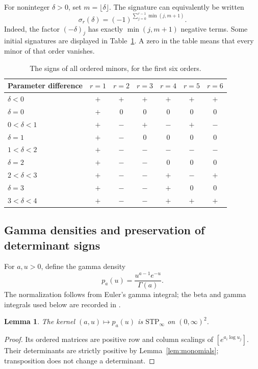 \documentclass[11pt,a4paper]{article}
\newtheorem{lemma}[theorem]{Lemma}
\theoremstyle{definition}
\theoremstyle{remark}
\newcommand{\STP}{\mathrm{STP}}
\begin{document}
For noninteger \(\delta>0\), set \(m=\lfloor\delta\rfloor\). The signature
can equivalently be written
\begin{equation}\label{eq:floor-sign}
 \sigma_r(\delta)=
 (-1)^{\sum_{j=0}^{r-1}\min(j,m+1)}.
\end{equation}
Indeed, the factor \((-\delta)_j\) has exactly
\(\min(j,m+1)\) negative terms. Some initial signatures are displayed in
Table~\ref{tab:signs}. A zero in the table means that every minor of that
order vanishes.

\begin{table}[htbp]
\centering
\caption{The signs of all ordered minors, for the first six orders.}
\label{tab:signs}
\begin{tabular}{lcccccc}
\toprule
Parameter difference & \(r=1\)&\(r=2\)&\(r=3\)&\(r=4\)&\(r=5\)&\(r=6\)\\
\midrule
\(\delta<0\)   & \(+\)&\(+\)&\(+\)&\(+\)&\(+\)&\(+\)\\
\(\delta=0\)   & \(+\)&\(0\)&\(0\)&\(0\)&\(0\)&\(0\)\\
\(0<\delta<1\) & \(+\)&\(-\)&\(+\)&\(-\)&\(+\)&\(-\)\\
\(\delta=1\)   & \(+\)&\(-\)&\(0\)&\(0\)&\(0\)&\(0\)\\
\(1<\delta<2\) & \(+\)&\(-\)&\(-\)&\(-\)&\(-\)&\(-\)\\
\(\delta=2\)   & \(+\)&\(-\)&\(-\)&\(0\)&\(0\)&\(0\)\\
\(2<\delta<3\) & \(+\)&\(-\)&\(-\)&\(+\)&\(-\)&\(+\)\\
\(\delta=3\)   & \(+\)&\(-\)&\(-\)&\(+\)&\(0\)&\(0\)\\
\(3<\delta<4\) & \(+\)&\(-\)&\(-\)&\(+\)&\(+\)&\(+\)\\
\bottomrule
\end{tabular}
\end{table}



\subsection{Gamma densities and preservation of determinant signs}

For \(a,u>0\), define the gamma density
\begin{equation}\label{eq:density}
 p_a(u)=\frac{u^{a-1}e^{-u}}{\Gamma(a)}.
\end{equation}
The normalization follows from Euler's gamma integral; the beta and gamma
integrals used below are recorded in \cite{DLMF}.

\begin{lemma}\label{lem:density}
The kernel \((a,u)\mapsto p_a(u)\) is \(\STP_\infty\) on
\((0,\infty)^2\).
\end{lemma}
\begin{proof}
Its ordered matrices are positive row and column scalings of
\([e^{a_i\log u_j}]\). Their determinants are strictly positive by
Lemma~\ref{lem:monomials}; transposition does not change a determinant.
\end{proof}
\end{document}
